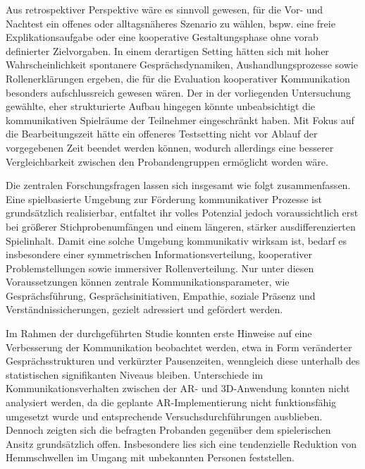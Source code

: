 Aus retrospektiver Perspektive wäre es sinnvoll gewesen, für die Vor- und Nachtest ein offenes oder alltagsnäheres Szenario zu wählen, bspw. eine freie Explikationsaufgabe oder eine kooperative Gestaltungsphase ohne vorab definierter Zielvorgaben. In einem derartigen Setting hätten sich mit hoher Wahrscheinlichkeit spontanere Gesprächsdynamiken, Aushandlungsprozesse sowie Rollenerklärungen ergeben, die für die Evaluation kooperativer Kommunikation besonders aufschlussreich gewesen wären. Der in der vorliegenden Untersuchung gewählte, eher strukturierte Aufbau hingegen könnte unbeabsichtigt die kommunikativen Spielräume der Teilnehmer eingeschränkt haben. Mit Fokus auf die Bearbeitungszeit hätte ein offeneres Testsetting nicht vor Ablauf der vorgegebenen Zeit beendet werden können, wodurch allerdings eine besserer Vergleichbarkeit zwischen den Probandengruppen ermöglicht worden wäre.

Die zentralen Forschungsfragen lassen sich insgesamt wie folgt zusammenfassen. Eine spielbasierte Umgebung zur Förderung kommunikativer Prozesse ist grundsätzlich realisierbar, entfaltet ihr volles Potenzial jedoch voraussichtlich erst bei größerer Stichprobenumfängen und einem längeren, stärker ausdifferenzierten Spielinhalt. Damit eine solche Umgebung kommunikativ wirksam ist, bedarf es insbesondere einer symmetrischen Informationsverteilung, kooperativer Problemstellungen sowie immersiver Rollenverteilung. Nur unter diesen Voraussetzungen können zentrale Kommunikationsparameter, wie Gesprächsführung, Gesprächsinitiativen, Empathie, soziale Präsenz und Verständnissicherungen, gezielt adressiert und gefördert werden.

Im Rahmen der durchgeführten Studie konnten erste Hinweise auf eine Verbesserung der Kommunikation beobachtet werden, etwa in Form veränderter Gesprächsstrukturen und verkürzter Pausenzeiten, wenngleich diese unterhalb des statistischen signifikanten Niveaus bleiben. Unterschiede im Kommunikationsverhalten zwischen der \ac{AR}- und \ac{3D}-Anwendung konnten nicht analysiert werden, da die geplante \ac{AR}-Implementierung nicht funktionsfähig umgesetzt wurde und entsprechende Versuchsdurchführungen ausblieben. Dennoch zeigten sich die befragten Probanden gegenüber dem spielerischen Ansitz grundsätzlich offen. Insbesondere lies sich eine tendenzielle Reduktion von Hemmschwellen im Umgang mit unbekannten Personen feststellen.